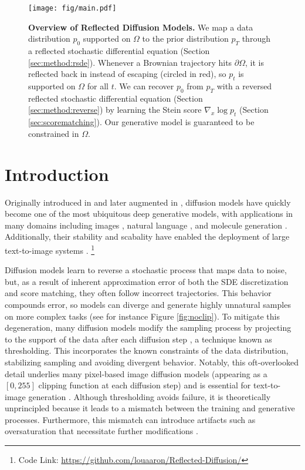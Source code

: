 \documentclass{article}
\theoremstyle{plain}
\theoremstyle{definition}
\theoremstyle{remark}
\newcommand{\grad}{\nabla}
\newcommand\blfootnote[1]{\begingroup
  \renewcommand\thefootnote{}\footnote{#1}\addtocounter{footnote}{-1}\endgroup
}
\begin{document}
\begin{figure*}[ht!]
    \centering
    \texttt{[image: fig/main.pdf]}
    \caption{\textbf{Overview of Reflected Diffusion Models.} We map a data distribution $p_0$ supported on $\Omega$ to the prior distribution $p_T$ through a reflected stochastic differential equation (Section \ref{sec:method:rsde}). Whenever a Brownian trajectory hits $\partial \Omega$, it is reflected back in instead of escaping (circled in red), so $p_t$ is supported on $\Omega$ for all $t$. We can recover $p_0$ from $p_T$ with a reversed reflected stochastic differential equation (Section \ref{sec:method:reverse}) by learning the Stein score $\grad_x \log p_t$ (Section \ref{sec:scorematching}). Our generative model is guaranteed to be constrained in $\Omega$.
    }\label{fig:main}
\end{figure*}

\section{Introduction}

Originally introduced in \citet{SohlDickstein2015DeepUL} and later augmented in \citet{song2019generative,Ho2020DenoisingDP, Song2020ScoreBasedGM}, diffusion models have quickly become one of the most ubiquitous deep generative models, with applications in many domains including images \citep{Dhariwal2021DiffusionMB}, natural language \citep{Li2022DiffusionLMIC}, and molecule generation \citep{Xu2022GeoDiffAG}. Additionally, their stability and scabality have enabled the deployment of large text-to-image systems \citep{Ramesh2022HierarchicalTI}.\blfootnote{Code Link: \href{https://github.com/louaaron/Reflected-Diffusion/}{https://github.com/louaaron/Reflected-Diffusion/}}


Diffusion models learn to reverse a stochastic process that maps data to noise, but, as a result of inherent approximation error of both the SDE discretization and score matching, they often follow incorrect trajectories. This behavior compounds error, so models can diverge and generate highly unnatural samples on more complex tasks (see for instance Figure \ref{fig:noclip}). To mitigate this degeneration, many diffusion models modify the sampling process by projecting to the support of the data after each diffusion step \citep{Ho2020DenoisingDP, Li2022DiffusionLMIC}, a technique known as thresholding. This incorporates the known constraints of the data distribution, stabilizing sampling and avoiding divergent behavior. Notably, this oft-overlooked detail underlies many pixel-based image diffusion models \citep{Ho2020DenoisingDP, Dhariwal2021DiffusionMB} (appearing as a $[0, 255]$ clipping function at each diffusion step) and is essential for text-to-image generation \citep{Saharia2022PhotorealisticTD}. Although thresholding avoids failure, it is theoretically unprincipled because it leads to a mismatch between the training and generative processes. Furthermore, this mismatch can introduce artifacts such as oversaturation \citep{Ho2022ClassifierFreeDG} that necessitate further modifications \citep{Saharia2022PhotorealisticTD}.
\end{document}
